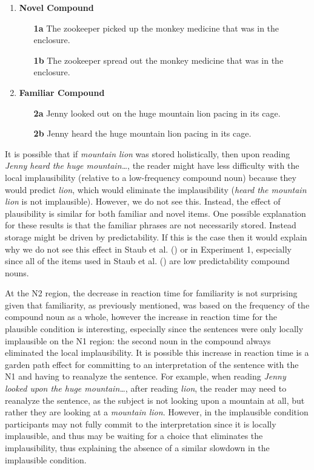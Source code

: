 \documentclass[
  12pt,
  letterpaper,
]{scrreprt}
\begin{document}
\begin{enumerate}
   \item \textbf{Novel Compound}
    \begin{enumerate}
        \item[\textbf{1a}] The zookeeper picked up the monkey medicine that was in the enclosure.
        \item[\textbf{1b}] The zookeeper spread out the monkey medicine that was in the enclosure.
    \end{enumerate} \label{staubsentencenovel}
    \item \textbf{Familiar Compound}
    \begin{enumerate}
        \item[\textbf{2a}] Jenny looked out on the huge mountain lion pacing in its cage. \label{familiarplaus}
        \item[\textbf{2b}] Jenny heard the huge mountain lion pacing in its cage. \label{familiarimplaus}
    \end{enumerate} \label{figanext}
\end{enumerate}

\noindent It is possible that if \emph{mountain lion} was stored
holistically, then upon reading \emph{Jenny heard the huge
mountain\ldots{}}, the reader might have less difficulty with the local
implausibility (relative to a low-frequency compound noun) because they
would predict \emph{lion}, which would eliminate the implausibility
(\emph{heard the mountain lion} is not implausible). However, we do not
see this. Instead, the effect of plausibility is similar for both
familiar and novel items. One possible explanation for these results is
that the familiar phrases are not necessarily stored. Instead storage
might be driven by predictability. If this is the case then it would
explain why we do not see this effect in Staub et al.
() or in Experiment
1, especially since all of the items used in Staub et al.
() are low
predictability compound nouns.

At the N2 region, the decrease in reaction time for familiarity is not
surprising given that familiarity, as previously mentioned, was based on
the frequency of the compound noun as a whole, however the increase in
reaction time for the plausible condition is interesting, especially
since the sentences were only locally implausible on the N1 region: the
second noun in the compound always eliminated the local implausibility.
It is possible this increase in reaction time is a garden path effect
for committing to an interpretation of the sentence with the N1 and
having to reanalyze the sentence. For example, when reading \emph{Jenny
looked upon the huge mountain\ldots{}}, after reading \emph{lion}, the
reader may need to reanalyze the sentence, as the subject is not looking
upon a mountain at all, but rather they are looking at a \emph{mountain
lion}. However, in the implausible condition participants may not fully
commit to the interpretation since it is locally implausible, and thus
may be waiting for a choice that eliminates the implausibility, thus
explaining the absence of a similar slowdown in the implausible
condition.
\end{document}

